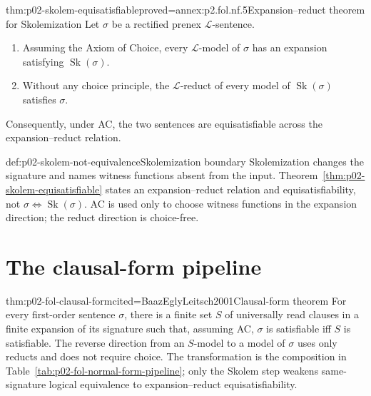 \begin{hbtheorem}{thm:p02-skolem-equisatisfiable}{proved=annex:p2.fol.nf.5}{Expansion--reduct theorem for Skolemization}
Let \(\sigma\) be a rectified prenex \(\mathcal L\)-sentence.
\begin{enumerate}
  \item Assuming the Axiom of Choice, every \(\mathcal L\)-model of
        \(\sigma\) has an expansion satisfying
        \(\operatorname{Sk}(\sigma)\).
  \item Without any choice principle, the \(\mathcal L\)-reduct of every
        model of \(\operatorname{Sk}(\sigma)\) satisfies \(\sigma\).
\end{enumerate}
Consequently, under AC, the two sentences are equisatisfiable across the
expansion--reduct relation.
\end{hbtheorem}

\begin{hbwarning}{def:p02-skolem-not-equivalence}{Skolemization boundary}
Skolemization changes the signature and names witness functions absent from
the input.  Theorem~\ref{thm:p02-skolem-equisatisfiable} states an
expansion--reduct relation and equisatisfiability, not
\(\sigma\Leftrightarrow\operatorname{Sk}(\sigma)\).  AC is used only to
choose witness functions in the expansion direction; the reduct direction
is choice-free.
\end{hbwarning}

\section{The clausal-form pipeline}
\label{sec:p02-fol-clausal-pipeline}

\begin{hbtheorem}{thm:p02-fol-clausal-form}{cited=BaazEglyLeitsch2001}{Clausal-form theorem}
For every first-order sentence \(\sigma\), there is a finite set \(S\) of
universally read clauses in a finite expansion of its signature such that,
assuming AC, \(\sigma\) is satisfiable iff \(S\) is satisfiable.  The reverse
direction from an \(S\)-model to a model of \(\sigma\) uses only reducts and
does not require choice.  The transformation is the composition in
Table~\ref{tab:p02-fol-normal-form-pipeline}; only the Skolem step weakens
same-signature logical equivalence to expansion--reduct equisatisfiability.
\end{hbtheorem}

